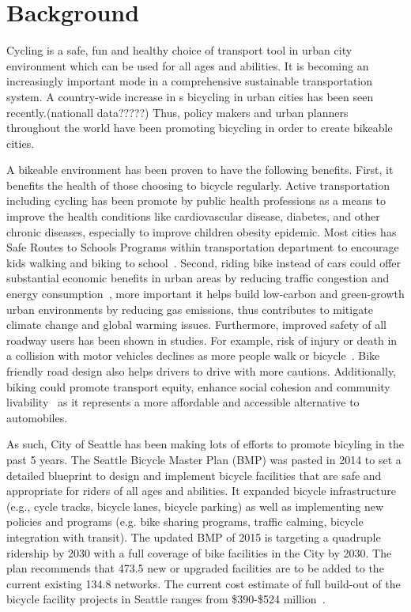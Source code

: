 \documentclass [11pt, proquest] {uwthesis}[2015/03/03]
\begin{document}
\section{Background}
Cycling is a safe, fun and healthy choice of transport tool in urban city environment which can be used for all ages and abilities. It is becoming an increasingly important mode in a comprehensive sustainable transportation system.  A country-wide increase in s bicycling in urban cities has been seen recently.(nationall data?????) Thus, policy makers and urban planners throughout the world have been promoting bicycling in order to create bikeable cities.  

A bikeable environment has been proven to have the following benefits. First, it benefits the health of those choosing to bicycle regularly. Active transportation including cycling has been promote by public health professions as a means to improve the health conditions like cardiovascular disease, diabetes, and other chronic diseases, especially to improve children obesity epidemic. Most cities has Safe Routes to Schools Programs within transportation department to encourage kids walking and biking to school~\cite{Skerett01,Colditz97}. Second, riding bike instead of cars could offer substantial economic benefits in urban areas by reducing traffic congestion and energy consumption~\cite{Sener09}, more important it helps build low-carbon and green-growth urban environments by reducing gas emissions, thus contributes to mitigate climate change and global warming issues. Furthermore, improved safety of all roadway users has been shown in studies. For example, risk of injury or death in a collision with motor vehicles declines as more people walk or bicycle~\cite{Turner06,Wittink03}. Bike friendly road design also helps drivers to drive with more cautions. Additionally, biking could promote transport equity, enhance social cohesion and community livability~\cite{Litman07} as it represents a more affordable and accessible alternative to automobiles.

As such, City of Seattle has been making lots of efforts to promote bicyling in the past 5 years. The Seattle Bicycle Master Plan (BMP) was pasted in 2014 to set a detailed blueprint to design and implement bicycle facilities that are safe and appropriate for riders of all ages and abilities. It expanded bicycle infrastructure (e.g., cycle tracks, bicycle lanes, bicycle parking) as well as implementing new policies and programs (e.g. bike sharing programs, traffic calming, bicycle integration with transit). The updated BMP of 2015 is targeting a quadruple ridership by 2030 with a full coverage of bike facilities in the City by 2030. The plan recommends that 473.5 new or upgraded facilities are to be added to the current existing 134.8 networks. The current cost estimate of full build-out of the bicycle facility projects in Seattle ranges from \$390-\$524 million~\cite{SDOT_BMP15}.
\end{document}
